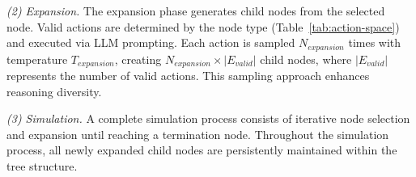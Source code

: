 \textit{(2) Expansion.}
The expansion phase generates child nodes from the selected node. Valid actions are determined by the node type (Table~\ref{tab:action-space}) and executed via LLM prompting. Each action is sampled $N_{expansion}$ times with temperature $T_{expansion}$, creating $N_{expansion} \times |{E}_{valid}|$ child nodes, where $|E_{valid}|$ represents the number of valid actions. This sampling approach enhances reasoning diversity.

\textit{(3) Simulation.}
A complete simulation process consists of iterative node selection and expansion until reaching a termination node. Throughout the simulation process, all newly expanded child nodes are persistently maintained within the tree structure.

